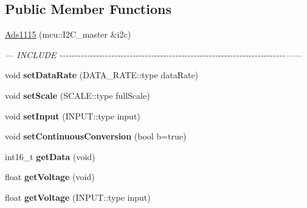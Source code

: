 \subsection*{Public Member Functions}
\begin{DoxyCompactItemize}
\item 
\hyperlink{classhal_1_1sensors_1_1_ads1115_a62a405ae1a3d8c663aea92f52387ab72}{Ads1115} (mcu\+::\+I2\+C\+\_\+master \&i2c)
\begin{DoxyCompactList}\small\item\em --- I\+N\+C\+L\+U\+D\+E -\/-\/-\/-\/-\/-\/-\/-\/-\/-\/-\/-\/-\/-\/-\/-\/-\/-\/-\/-\/-\/-\/-\/-\/-\/-\/-\/-\/-\/-\/-\/-\/-\/-\/-\/-\/-\/-\/-\/-\/-\/-\/-\/-\/-\/-\/-\/-\/-\/-\/-\/-\/-\/-\/-\/-\/-\/-\/-\/-\/-\/-\/-\/-\/-\/-\/-\/-\/-\/-\/-\/-\/-\/-\/------ \end{DoxyCompactList}\item 
\hypertarget{classhal_1_1sensors_1_1_ads1115_a85ea1023058ab073fd8381f49345e965}{}void {\bfseries set\+Data\+Rate} (D\+A\+T\+A\+\_\+\+R\+A\+T\+E\+::type data\+Rate)\label{classhal_1_1sensors_1_1_ads1115_a85ea1023058ab073fd8381f49345e965}

\item 
\hypertarget{classhal_1_1sensors_1_1_ads1115_ad59a367d98b5305582b74e11efeacaac}{}void {\bfseries set\+Scale} (S\+C\+A\+L\+E\+::type full\+Scale)\label{classhal_1_1sensors_1_1_ads1115_ad59a367d98b5305582b74e11efeacaac}

\item 
\hypertarget{classhal_1_1sensors_1_1_ads1115_a2f9fb0d6132eaa581d603f589f532819}{}void {\bfseries set\+Input} (I\+N\+P\+U\+T\+::type input)\label{classhal_1_1sensors_1_1_ads1115_a2f9fb0d6132eaa581d603f589f532819}

\item 
\hypertarget{classhal_1_1sensors_1_1_ads1115_aced1e5b24eb295bfa976ec0df08010ac}{}void {\bfseries set\+Continuous\+Conversion} (bool b=true)\label{classhal_1_1sensors_1_1_ads1115_aced1e5b24eb295bfa976ec0df08010ac}

\item 
\hypertarget{classhal_1_1sensors_1_1_ads1115_a5989e0c941825c3014d6856687900f29}{}int16\+\_\+t {\bfseries get\+Data} (void)\label{classhal_1_1sensors_1_1_ads1115_a5989e0c941825c3014d6856687900f29}

\item 
\hypertarget{classhal_1_1sensors_1_1_ads1115_a1cc14c8544d652a987f9bed48836270a}{}float {\bfseries get\+Voltage} (void)\label{classhal_1_1sensors_1_1_ads1115_a1cc14c8544d652a987f9bed48836270a}

\item 
\hypertarget{classhal_1_1sensors_1_1_ads1115_aac9c1d94d731a115387b06725a2620f8}{}float {\bfseries get\+Voltage} (I\+N\+P\+U\+T\+::type input)\label{classhal_1_1sensors_1_1_ads1115_aac9c1d94d731a115387b06725a2620f8}

\end{DoxyCompactItemize}


